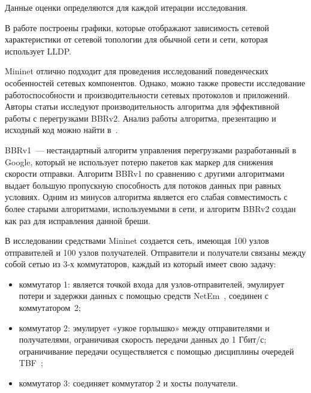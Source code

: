 Данные оценки определяются для каждой итерации исследования. %

В работе \cite{article_paoccmisdn} %
построены графики, которые отображают зависимость
сетевой характеристики от сетевой топологии для обычной сети и сети,
которая использует LLDP. %

Mininet отлично подходит для проведения исследований поведенческих
особенностей сетевых компонентов. Однако, можно также провести
исследование работоспособности и производительности сетевых протоколов
и приложений. Авторы статьи \cite{article_apeotba} исследуют
производительность алгоритма для эффективной работы с перегрузками
BBRv2. Анализ работы алгоритма, презентацию и исходный код можно найти
в~\cite{bbrv2}.

BBRv1~--- нестандартный алгоритм управления перегрузками разработанный
в Google, который не использует потерю пакетов как маркер для снижения
скорости отправки. Алгоритм BBRv1 \cite{bbrv1} по сравнению с другими
алгоритмами выдает большую пропускную способность для
потоков данных при равных условиях.  Одним из минусов алгоритма
является его слабая совместимость с более старыми алгоритмами,
используемыми в сети, и алгоритм BBRv2 создан как раз для исправления
данной бреши.

В исследовании \cite{article_apeotba} средствами Mininet создается
сеть, имеющая 100 узлов отправителей и 100 узлов получателей.
Отправители и получатели связаны между собой сетью из 3-х
коммутаторов, каждый из который имеет свою задачу:
\begin{itemize}
\item коммутатор 1: является точкой входа для узлов-отправителей,
  эмулирует потери и задержки данных с помощью средств
  NetEm~\cite{tc_netem}, соединен с коммутатором~2;
\item коммутатор 2: эмулирует «узкое горлышко» между отправителями и
  получателями, ограничивая скорость передачи данных до 1 Гбит/с;
  ограничивание передачи осуществляется с помощью дисциплины очередей
  TBF~\cite{tc_tbf};
\item коммутатор 3: соединяет коммутатор 2 и хосты получатели.
\end{itemize}


